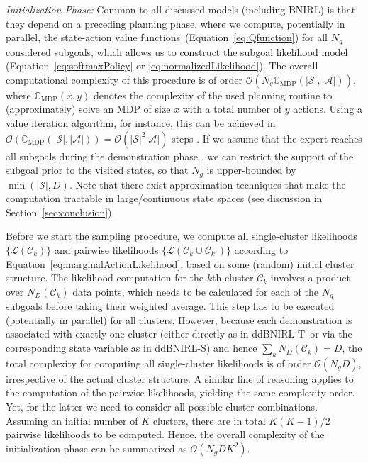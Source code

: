 \documentclass[twoside,11pt]{article}
\newcommand{\ddBNIRLT}{\mbox{ddBNIRL-T}}
\begin{document}
\noindent \textit{Initialization Phase:}
Common to all discussed models (including BNIRL) is that they depend on a preceding planning phase, %
where we compute, potentially in parallel, the state-action value functions~(Equation~\ref{eq:Qfunction}) for all $N_g$ considered subgoals, %
which allows us to construct the subgoal likelihood model (Equation~\ref{eq:softmaxPolicy} or \ref{eq:normalizedLikelihood}). The overall computational complexity of this procedure is of order $\mathcal{O}(N_g\mathbb{C}_\text{MDP}(|\mathcal{S}|,|\mathcal{A}|))$, where $\mathbb{C}_\text{MDP}(x,y)$ denotes the complexity of the used planning routine to (approximately) solve an MDP of size $x$ with a total number of $y$ actions. Using a value iteration algorithm, for instance, this can be achieved %
in $\mathcal{O}(\mathbb{C}_\text{MDP}(|\mathcal{S}|,|\mathcal{A}|))=\mathcal{O}(|\mathcal{S}|^2|\mathcal{A}|)$ steps \citep{littman1995complexity}.
If we assume that the expert reaches all subgoals during the demonstration phase \citep{michini2012bayesian}, we can restrict the support of the subgoal prior to the visited states, so that $N_g$ is upper-bounded by $\min(|\mathcal{S}|,D)$. Note that there %
exist approximation techniques that make the computation tractable in large/continuous state spaces (see discussion in Section~\ref{sec:conclusion}).

Before we start the sampling procedure, we %
compute all single-cluster likelihoods $\{\mathcal{L}(\mathcal{C}_k)\}$ and pairwise likelihoods $\{\mathcal{L}(\mathcal{C}_k\cup\mathcal{C}_{k'})\}$ according to Equation~\eqref{eq:marginalActionLikelihood}, based on some (random) initial cluster structure. 
The likelihood computation for the $k$th cluster $\mathcal{C}_k$ involves a product over $N_{D}(\mathcal{C}_k)$ data points, which needs to be calculated for each of the $N_g$ subgoals before taking their weighted average. This step has to be executed (potentially in parallel) for all clusters. However, because each %
%
demonstration is associated with exactly one cluster (either directly as in \ddBNIRLT\  or via the corresponding state variable as in ddBNIRL-S) and hence $\sum_kN_{D}(\mathcal{C}_k)=D$, the total %
complexity for computing all single-cluster likelihoods is of order $\mathcal{O}(N_gD)$, irrespective of the actual cluster structure. A similar line of reasoning applies to the computation of the pairwise likelihoods, yielding the same complexity order. %
Yet, for the latter we need to consider all possible cluster combinations.
%
Assuming an initial number of $K$ clusters, there are in total $K(K-1)/2$ pairwise likelihoods to be computed. Hence, the overall complexity of the initialization phase can be summarized as $\mathcal{O}(N_gDK^2)$.\\
\end{document}
